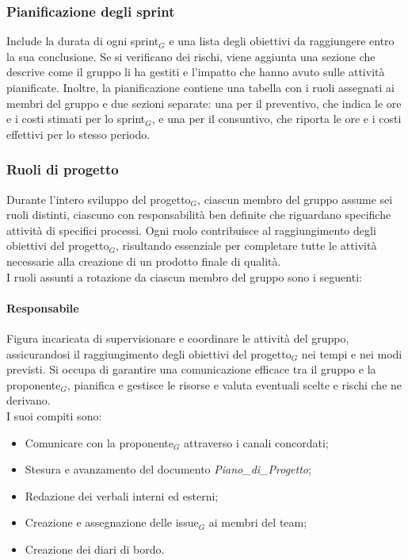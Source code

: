 \documentclass[10pt]{article}
\begin{document}
\begin{justify}
    \subsubsection{Pianificazione degli sprint}
    Include la durata di ogni sprint$_G$ e una lista degli obiettivi da raggiungere entro la sua conclusione. Se si verificano dei rischi, viene aggiunta una sezione che descrive come il gruppo li ha gestiti e l'impatto che hanno avuto sulle attività pianificate. Inoltre, la pianificazione contiene una tabella con i ruoli assegnati ai membri del gruppo e due sezioni separate: una per il preventivo, che indica le ore e i costi stimati per lo sprint$_G$, e una per il consuntivo, che riporta le ore e i costi effettivi per lo stesso periodo.

    \subsubsection{Ruoli di progetto}
    Durante l'intero sviluppo del progetto$_G$, ciascun membro del gruppo assume sei ruoli distinti, ciascuno con responsabilità ben definite che riguardano specifiche attività di specifici processi.
    Ogni ruolo contribuisce al raggiungimento degli obiettivi del progetto$_G$, risultando essenziale per completare tutte le attività necessarie alla creazione di un prodotto finale di qualità.\\
    I ruoli assunti a rotazione da ciascun membro del gruppo sono i seguenti:

        \paragraph{Responsabile}
        Figura incaricata di supervisionare e coordinare le attività del gruppo, assicurandosi il raggiungimento degli obiettivi del progetto$_G$ nei tempi e nei modi previsti. Si occupa di garantire una comunicazione efficace tra il gruppo e la proponente$_G$, pianifica e gestisce le risorse e valuta eventuali scelte e rischi che ne derivano.\\
        I suoi compiti sono:
        \begin{itemize}
            \item Comunicare con la proponente$_G$ attraverso i canali concordati;
            \item Stesura e avanzamento del documento \textit{Piano\_di\_Progetto};
            \item Redazione dei verbali interni ed esterni;
            \item Creazione e assegnazione delle issue$_G$ ai membri del team;
            \item Creazione dei diari di bordo.
        \end{itemize}


\end{justify}
\end{document}

